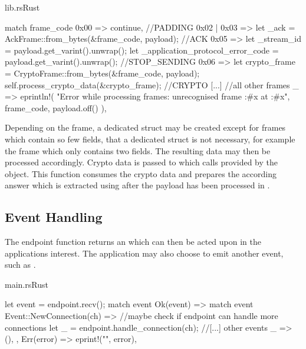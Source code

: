\begin{codeblock}{lib.rs}{Rust}
    \begin{rustcode}
        match frame_code {
            0x00 => continue, //PADDING
            0x02 | 0x03 => {
                let _ack = AckFrame::from_bytes(&frame_code, payload);
            } //ACK
            0x05 => {
                let _stream_id = payload.get_varint().unwrap();
                let _application_protocol_error_code = payload.get_varint().unwrap();
            } //STOP_SENDING
            0x06 => {
                let crypto_frame = CryptoFrame::from_bytes(&frame_code, payload);
                self.process_crypto_data(&crypto_frame);
            } //CRYPTO
            [...] //all other frames
            _ => eprintln!(
                "Error while processing frames: unrecognised frame {:#x} at {:#x}",
                frame_code,
                payload.off()
            ),
        }
    \end{rustcode}
    \label{process_payload_code}
\end{codeblock}

Depending on the frame, a dedicated struct may be created except for frames which contain so few fields, that a dedicated struct
is not necessary, for example the  frame which only contains two fields. The resulting data may then be processed
accordingly. Crypto data is passed to  which calls  provided by the
 object. This function consumes the crypto data and prepares the according answer which is extracted
using  after the payload has been processed in .

\subsection{Event Handling}

The endpoint function  returns an  which can then be acted upon in the applications interest. The
application may also choose to emit another event, such as .

\begin{codeblock}{main.rs}{Rust}
    \begin{rustcode}
        let event = endpoint.recv();
        match event {
            Ok(event) => match event {
                Event::NewConnection(ch) => {
                    //maybe check if endpoint can handle more connections
                    let _ = endpoint.handle_connection(ch);
                }
                //[...] other events
                _ => (),
            },
            Err(error) => eprint!("{}", error),
        }
    \end{rustcode}
    \label{event_handling_main}
\end{codeblock}

